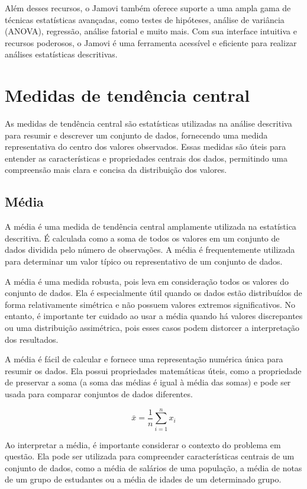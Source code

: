 Além desses recursos, o Jamovi também oferece suporte a uma ampla gama de técnicas estatísticas avançadas, como testes de hipóteses, análise de variância (ANOVA), regressão, análise fatorial e muito mais. Com sua interface intuitiva e recursos poderosos, o Jamovi é uma ferramenta acessível e eficiente para realizar análises estatísticas descritivas.

\section{Medidas de tendência central}


As medidas de tendência central são estatísticas utilizadas na análise descritiva para resumir e descrever um conjunto de dados, fornecendo uma medida representativa do centro dos valores observados. Essas medidas são úteis para entender as características e propriedades centrais dos dados, permitindo uma compreensão mais clara e concisa da distribuição dos valores.

\subsection{Média}

A média é uma medida de tendência central amplamente utilizada na estatística descritiva. É calculada como a soma de todos os valores em um conjunto de dados dividida pelo número de observações. A média é frequentemente utilizada para determinar um valor típico ou representativo de um conjunto de dados.

A média é uma medida robusta, pois leva em consideração todos os valores do conjunto de dados. Ela é especialmente útil quando os dados estão distribuídos de forma relativamente simétrica e não possuem valores extremos significativos. No entanto, é importante ter cuidado ao usar a média quando há valores discrepantes ou uma distribuição assimétrica, pois esses casos podem distorcer a interpretação dos resultados.

A média é fácil de calcular e fornece uma representação numérica única para resumir os dados. Ela possui propriedades matemáticas úteis, como a propriedade de preservar a soma (a soma das médias é igual à média das somas) e pode ser usada para comparar conjuntos de dados diferentes.

\[
\bar{x} = \frac{1}{n} \sum_{i=1}^{n} x_i
\]

Ao interpretar a média, é importante considerar o contexto do problema em questão. Ela pode ser utilizada para compreender características centrais de um conjunto de dados, como a média de salários de uma população, a média de notas de um grupo de estudantes ou a média de idades de um determinado grupo.

